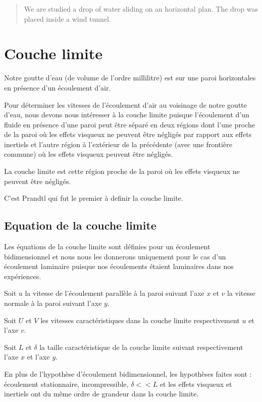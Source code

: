 \documentclass[french]{article}
\begin{document}
 
\tableofcontents
 
\vspace{2cm} %
 
\begin{abstract}
We are studied a drop of water sliding on an horizontal plan. The drop was placed inside a wind tunnel.
\end{abstract}

\section{Couche limite}
Notre goutte d'eau (de volume de l'ordre millilitre) est sur une paroi horizontales en présence d'un écoulement d'air.


Pour déterminer les vitesses de l'écoulement d'air au voisinage de notre goutte d'eau, nous devons nous intéresser à la couche limite puisque l'écoulement d'un fluide en présence d'une paroi peut être séparé en deux régions dont l'une proche de la paroi où les effets visqueux ne peuvent être négligés par rapport aux effets inertiels et l'autre région à l'extérieur de la précédente (avec une frontière commune) où les effets visqueux peuvent être négligés.

La couche limite est cette région proche de la paroi où les effets visqueux ne peuvent être négligés.

C'est Prandtl qui fut le premier à definir la couche limite. 

\subsection{Equation de la couche limite }

Les équations de la couche limite sont définies pour un écoulement bidimensionnel et nous nous les donnerons uniquement pour le cas d'un écoulement laminaire puisque nos écoulements étaient laminaires dans nos expériences.

Soit $u$ la vitesse de l'écoulement parallèle à la paroi suivant l'axe $x$ et $v$ la vitesse normale à la paroi suivant l'axe $y$.

Soit $U$ et $V$ les vitesses caractéristiques dans la couche limite respectivement $u$ et l'axe $v$.

Soit $L$ et $\delta$ la taille caractéristique de la couche limite suivant respectivement l'axe $x$ et l'axe $y$.

En plus de l'hypothèse d'écoulement bidimensionnel, les hypothèses faites sont : écoulement stationnaire, incompressible, $\delta << L$ et les effets visqueux et inertiels ont du même ordre de grandeur dans la couche limite.
\end{document}

